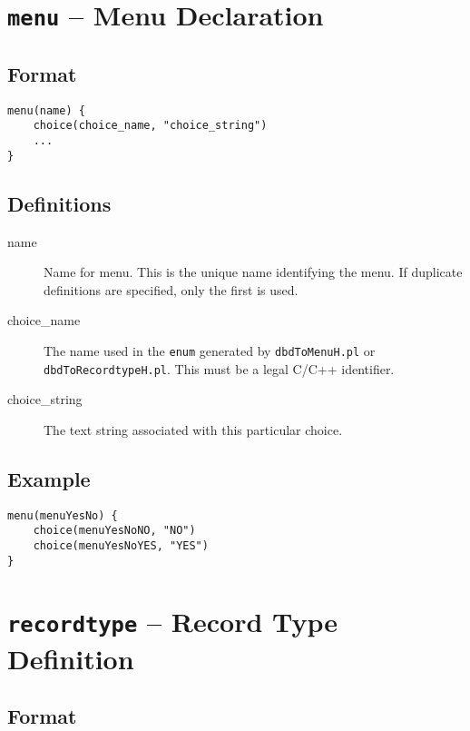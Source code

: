 \section{\texttt{menu} -- Menu Declaration}

\subsection{Format}

\begin{verbatim}
menu(name) {
    choice(choice_name, "choice_string")
    ...
}
\end{verbatim}

\subsection{Definitions}

\begin{description}
\item [name] Name for menu. This is the unique name identifying the menu.
If duplicate definitions are specified, only the first is used.

\item [choice\_name] The name used in the \verb|enum| generated by \verb|dbdToMenuH.pl| or \verb|dbdToRecordtypeH.pl|.
This must be a legal C/C++ identifier.

\item [choice\_string] The text string associated with this particular choice.
\end{description}

\subsection{Example}

\begin{verbatim}
menu(menuYesNo) {
    choice(menuYesNoNO, "NO")
    choice(menuYesNoYES, "YES")
}
\end{verbatim}

\section{\texttt{recordtype} -- Record Type Definition}

\subsection{Format}

